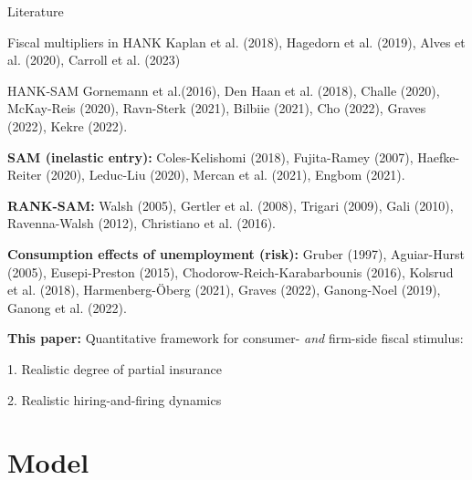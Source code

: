 \documentclass[aspectratio=169]{beamer}
\begin{document}
\begin{frame}{Literature}
	\footnotesize	
	\begin{block}{Fiscal multipliers in HANK}
		Kaplan et al. (2018), Hagedorn et al. (2019), Alves et al. (2020), Carroll et al. (2023)
	\end{block}
	
	\medskip
	
	\begin{block}{HANK-SAM}
		Gornemann et al.(2016), Den Haan et al. (2018), Challe (2020), McKay-Reis (2020), Ravn-Sterk (2021), Bilbiie (2021), Cho (2022), Graves (2022), Kekre (2022).
	\end{block}

\label{slide:literature}

\medskip
\scriptsize
\textbf{SAM (inelastic entry):}
Coles-Kelishomi (2018), Fujita-Ramey (2007), Haefke-Reiter (2020),
Leduc-Liu (2020), Mercan et al. (2021), Engbom (2021).

\smallskip


\smallskip

\textbf{RANK-SAM:}
Walsh (2005), Gertler et al. (2008), Trigari (2009), Gali (2010),
Ravenna-Walsh (2012), Christiano et al. (2016).

\smallskip

\textbf{Consumption effects
of unemployment (risk): }Gruber (1997), Aguiar-Hurst
(2005), Eusepi-Preston (2015), Chodorow-Reich-Karabarbounis (2016),
Kolsrud et al. (2018), Harmenberg-\"{O}berg (2021), Graves (2022), Ganong-Noel
(2019), Ganong et al. (2022).

\bigskip

\normalsize
\textbf{This paper:}
Quantitative framework for consumer- \emph{and} firm-side fiscal stimulus:

\hspace{2mm}1. Realistic degree of partial insurance

\hspace{2mm}2. Realistic hiring-and-firing dynamics

\end{frame}

\section{Model}
\end{document}
